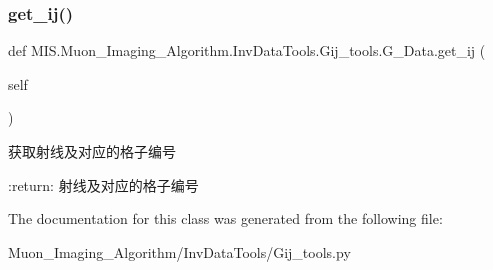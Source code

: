 \subsubsection{\texorpdfstring{get\+\_\+ij()}{get\_ij()}}
{\footnotesize\ttfamily def M\+I\+S.\+Muon\+\_\+\+Imaging\+\_\+\+Algorithm.\+Inv\+Data\+Tools.\+Gij\+\_\+tools.\+G\+\_\+\+Data.\+get\+\_\+ij (\begin{DoxyParamCaption}\item[{}]{self }\end{DoxyParamCaption})}

\begin{DoxyVerb}获取射线及对应的格子编号

:return: 射线及对应的格子编号
\end{DoxyVerb}
 

The documentation for this class was generated from the following file\+:\begin{DoxyCompactItemize}
\item 
Muon\+\_\+\+Imaging\+\_\+\+Algorithm/\+Inv\+Data\+Tools/Gij\+\_\+tools.\+py\end{DoxyCompactItemize}
